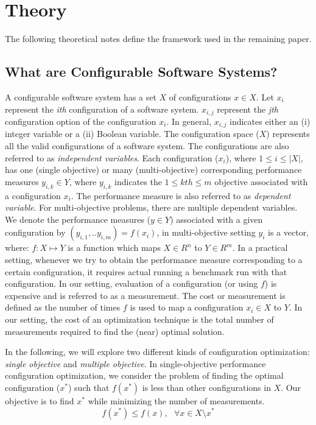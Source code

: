 \section{Theory}
The following theoretical notes define the framework used in the remaining paper.

\subsection{What are Configurable Software Systems?}\label{sec:problem_formal_flash}

 
A configurable software system has a set $X$ of configurations $x \in X$. 
Let $x_i$ represent the \textit{ith} configuration of a software system. $x_{i,j}$ represent the \textit{jth} configuration option of the configuration $x_i$. In general, $x_{i,j}$ indicates either an (i) integer variable or a (ii) Boolean variable. The configuration space ($X$) represents all the valid configurations of a software system. The configurations are also referred to as \textit{independent variables}.
Each configuration ($x_i$), where $1\le i\le |X|$, has one (single objective) or many (multi-objective) corresponding performance measures $y_{i,k} \in Y$, where $y_{i,k}$  indicates the $1\le kth\le m$ objective  associated with a configuration $x_i$. The performance measure is also referred to as \textit{dependent variable}. For multi-objective problems, there are multiple dependent variables. 
We denote the performance measures ($y\in Y$) associated with a given configuration by $(y_{i,1},..y_{i,m})=f(x_i)$, in multi-objective setting $y_i$ is a vector, where: $f: X\mapsto Y $ is a function which maps $X \in R^n$ to $Y \in R^m$. In a practical setting, whenever we try to obtain the performance measure corresponding to a certain configuration, it requires actual running a benchmark run with that configuration. In our setting, evaluation of a configuration (or using $f$) is expensive and is referred to as a measurement. The cost or measurement is defined as the number of times $f$ is used to map a configuration $x_i \in X$ to $Y$. In our setting, the cost of an optimization technique is the total number of measurements required to find the (near) optimal solution.

In the following, we will explore two different kinds of configuration optimization: {\em single objective}
and {\em multiple objective}.
In single-objective performance configuration optimization,
we consider the problem of finding the optimal configuration ($x^*$) such that $f(x^*)$ is less than other configurations in $X$. Our objective is to find $x^*$ while minimizing the number of measurements.
\begin{equation}
    f(x^*) \le f(x),~~~ \forall x \in {X\setminus x^*}
\end{equation}
 
